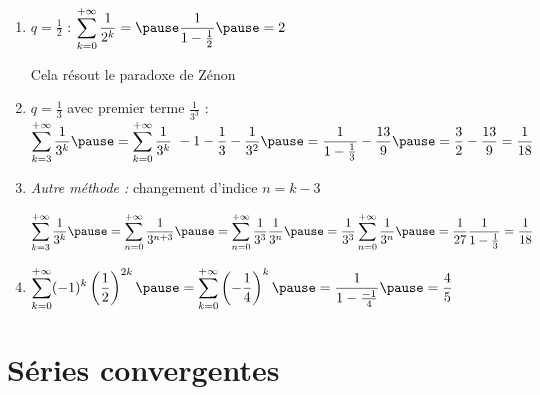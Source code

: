\begin{frame}

\begin{exemple}
\begin{enumerate}
  \item\pause $q=\frac 12$ : \quad \pause
  $\displaystyle \sum_{k=0}^{+\infty} \frac{1}{2^k} = \pause \frac{1}{1-\frac12} \pause = 2$
  
  \pause
  Cela résout le paradoxe de Zénon 
\vspace{.2cm}
  
  \item\pause $q=\frac 13$ avec premier terme $\frac{1}{3^3}$ : \pause
  $\displaystyle \sum_{k=3}^{+\infty} \frac{1}{3^k} \pause = \sum_{k=0}^{+\infty} \frac{1}{3^k} \  -  1 - \frac 13-\frac 1{3^2}  \pause
  = \frac{1}{1-\frac13} - \frac{13}{9} \pause = \frac32-\frac{13}{9} = \frac{1}{18}$
\vspace{.2cm}
  
  \item\pause  \emph{Autre méthode :} \pause changement d'indice $n=k-3$

$\displaystyle\sum_{k=3}^{+\infty} \frac{1}{3^k} 
\pause= \sum_{n=0}^{+\infty} \frac{1}{3^{n+3}}
\pause= \sum_{n=0}^{+\infty} \frac{1}{3^3}\frac{1}{3^n}
\pause= \frac{1}{3^3}\sum_{n=0}^{+\infty} \frac{1}{3^n}
\pause= \frac{1}{27}\frac{1}{1-\frac13}
= \frac{1}{18}$
\vspace{.2cm}

  \item\pause $\displaystyle \sum_{k=0} ^{+\infty} (-1)^k \left(\frac{1}{2}\right)^{2k}
  \pause =\sum_{k=0} ^{+\infty} \left(-\frac{1}{4}\right)^k \pause=\frac{1}{1-\frac{-1}{4}} \pause=\frac{4}{5}$
 
\end{enumerate}
\end{exemple}

\end{frame}



\section{Séries convergentes}


